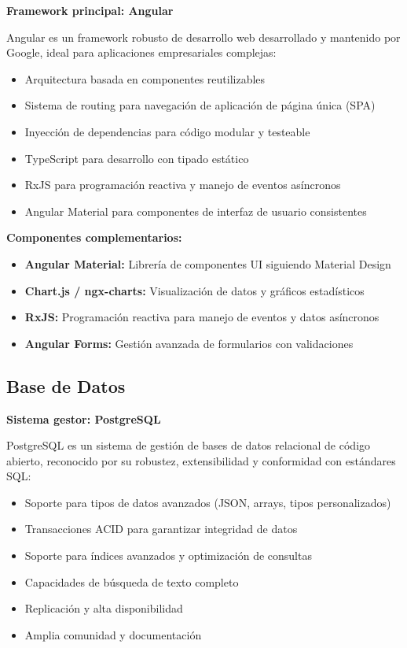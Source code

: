 \documentclass[12pt,letterpaper]{article}
\begin{document}
\textbf{Framework principal: Angular}

Angular es un framework robusto de desarrollo web desarrollado y mantenido por Google, ideal para aplicaciones empresariales complejas:

\begin{itemize}
    \item Arquitectura basada en componentes reutilizables
    \item Sistema de routing para navegación de aplicación de página única (SPA)
    \item Inyección de dependencias para código modular y testeable
    \item TypeScript para desarrollo con tipado estático
    \item RxJS para programación reactiva y manejo de eventos asíncronos
    \item Angular Material para componentes de interfaz de usuario consistentes
\end{itemize}

\textbf{Componentes complementarios:}

\begin{itemize}
    \item \textbf{Angular Material:} Librería de componentes UI siguiendo Material Design
    \item \textbf{Chart.js / ngx-charts:} Visualización de datos y gráficos estadísticos
    \item \textbf{RxJS:} Programación reactiva para manejo de eventos y datos asíncronos
    \item \textbf{Angular Forms:} Gestión avanzada de formularios con validaciones
\end{itemize}

\subsection{Base de Datos}

\textbf{Sistema gestor: PostgreSQL}

PostgreSQL es un sistema de gestión de bases de datos relacional de código abierto, reconocido por su robustez, extensibilidad y conformidad con estándares SQL:

\begin{itemize}
    \item Soporte para tipos de datos avanzados (JSON, arrays, tipos personalizados)
    \item Transacciones ACID para garantizar integridad de datos
    \item Soporte para índices avanzados y optimización de consultas
    \item Capacidades de búsqueda de texto completo
    \item Replicación y alta disponibilidad
    \item Amplia comunidad y documentación
\end{itemize}
\end{document}
